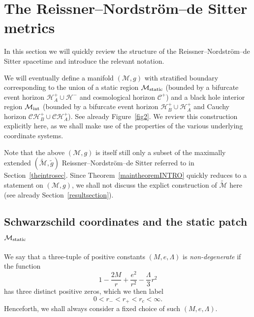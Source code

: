 \documentclass[A4,10pt]{article}
\begin{document}
\section{The Reissner--Nordstr\"om--de Sitter metrics}\label{prelim}
In this section we will quickly review the structure of the Reissner--Nordstr\"om--de 
Sitter spacetime and introduce the relevant notation. 



We will eventually define a manifold $(\mathcal{M},g)$ with stratified boundary corresponding
to the union of a static region $\mathcal{M}_{\rm static}$ 
(bounded by a bifurcate event horizon $\mathcal{H}^+_A\cup\mathcal{H}^-$ 
and cosmological horizon $\mathcal{C}^+$) and
a black hole interior region
$\mathcal{M}_{\rm int}$ 
(bounded by a bifurcate event horizon $\mathcal{H}^+_B\cup\mathcal{H}^+_A$ 
and Cauchy horizon $\mathcal{CH}^+_B\cup \mathcal{CH}^+_A$).
See already Figure~\ref{fig2}. 
We review this construction explicitly here, as we shall make use of the properties
of the various underlying coordinate systems. 

Note that the above  $(\mathcal{M},g)$ 
is itself still only a subset of the maximally extended $(\widetilde{\mathcal{M}} , \widetilde{g})$
Reissner--Nordstr\"om--de Sitter referred to in Section~\ref{theintrosec}.
Since Theorem~\ref{maintheoremINTRO} quickly reduces to a
statement on $(\mathcal{M},g)$, we shall not discuss the explict construction of
$\widetilde{\mathcal{M}}$ here (see already Section~\ref{resultsection}).


\subsection{Schwarzschild coordinates and the static patch $\mathcal{M}_{\rm static}$}
We say that a three-tuple of positive constants $(M,e,\Lambda)$ is \emph{non-degenerate} if the function
\[1 - \frac{2M}{r} +\frac{e^2}{r^2} - \frac{\Lambda}{3}r^2\]
has three distinct positive zeros, which we then label
\begin{equation}\label{rplusminusc}
0 < r_- < r_+ < r_c < \infty.
\end{equation}
Henceforth, we shall always consider a fixed choice of such $(M,e,\Lambda)$.
\end{document}
